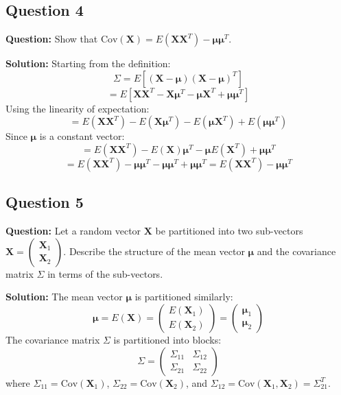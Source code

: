 \subsection*{Question 4}
\textbf{Question:} Show that $\text{Cov}(\mathbf{X}) = E(\mathbf{X}\mathbf{X}^T) - \boldsymbol{\mu}\boldsymbol{\mu}^T$.

\textbf{Solution:}
Starting from the definition:
$$ \Sigma = E[(\mathbf{X} - \boldsymbol{\mu})(\mathbf{X} - \boldsymbol{\mu})^T] $$
$$ = E[\mathbf{X}\mathbf{X}^T - \mathbf{X}\boldsymbol{\mu}^T - \boldsymbol{\mu}\mathbf{X}^T + \boldsymbol{\mu}\boldsymbol{\mu}^T] $$
Using the linearity of expectation:
$$ = E(\mathbf{X}\mathbf{X}^T) - E(\mathbf{X}\boldsymbol{\mu}^T) - E(\boldsymbol{\mu}\mathbf{X}^T) + E(\boldsymbol{\mu}\boldsymbol{\mu}^T) $$
Since $\boldsymbol{\mu}$ is a constant vector:
$$ = E(\mathbf{X}\mathbf{X}^T) - E(\mathbf{X})\boldsymbol{\mu}^T - \boldsymbol{\mu}E(\mathbf{X}^T) + \boldsymbol{\mu}\boldsymbol{\mu}^T $$
$$ = E(\mathbf{X}\mathbf{X}^T) - \boldsymbol{\mu}\boldsymbol{\mu}^T - \boldsymbol{\mu}\boldsymbol{\mu}^T + \boldsymbol{\mu}\boldsymbol{\mu}^T = E(\mathbf{X}\mathbf{X}^T) - \boldsymbol{\mu}\boldsymbol{\mu}^T $$

\subsection*{Question 5}
\textbf{Question:} Let a random vector $\mathbf{X}$ be partitioned into two sub-vectors $\mathbf{X} = \begin{pmatrix} \mathbf{X}_1 \\ \mathbf{X}_2 \end{pmatrix}$. Describe the structure of the mean vector $\boldsymbol{\mu}$ and the covariance matrix $\Sigma$ in terms of the sub-vectors.

\textbf{Solution:}
The mean vector $\boldsymbol{\mu}$ is partitioned similarly:
$$ \boldsymbol{\mu} = E(\mathbf{X}) = \begin{pmatrix} E(\mathbf{X}_1) \\ E(\mathbf{X}_2) \end{pmatrix} = \begin{pmatrix} \boldsymbol{\mu}_1 \\ \boldsymbol{\mu}_2 \end{pmatrix} $$
The covariance matrix $\Sigma$ is partitioned into blocks:
$$ \Sigma = \begin{pmatrix} \Sigma_{11} & \Sigma_{12} \\ \Sigma_{21} & \Sigma_{22} \end{pmatrix} $$
where $\Sigma_{11} = \text{Cov}(\mathbf{X}_1)$, $\Sigma_{22} = \text{Cov}(\mathbf{X}_2)$, and $\Sigma_{12} = \text{Cov}(\mathbf{X}_1, \mathbf{X}_2) = \Sigma_{21}^T$.

